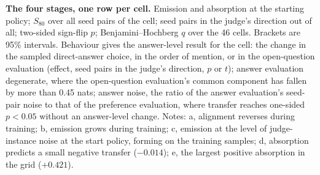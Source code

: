 \begin{table}[p]
\caption{\textbf{The four stages, one row per cell.} Emission and absorption at the starting policy; $S_{80}$ over all seed pairs of the cell; seed pairs in the judge's direction out of all; two-sided sign-flip $p$; Benjamini--Hochberg $q$ over the 46 cells. Brackets are 95\% intervals. Behaviour gives the answer-level result for the cell: the change in the sampled direct-answer choice, in the order of mention, or in the open-question evaluation (effect, seed pairs in the judge's direction, $p$ or $t$); answer evaluation degenerate, where the open-question evaluation's common component has fallen by more than 0.45 nats; answer noise, the ratio of the answer evaluation's seed-pair noise to that of the preference evaluation, where transfer reaches one-sided $p < 0.05$ without an answer-level change. Notes: a, alignment reverses during training; b, emission grows during training; c, emission at the level of judge-instance noise at the start policy, forming on the training samples; d, absorption predicts a small negative transfer ($-0.014$); e, the largest positive absorption in the grid ($+0.421$).}
\label{tab:main}
{\tabsize\setlength{\tabcolsep}{2.3pt}}
\end{table}
